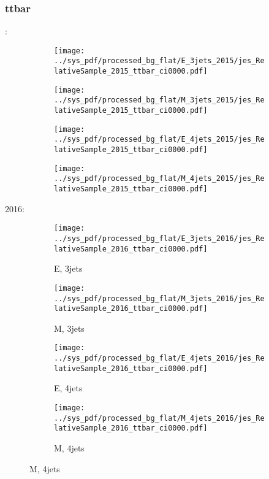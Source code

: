 \documentclass{beamer}
\begin{document}
\begin{frame}
\frametitle{ttbar}
\fontsize{5}{1}:
\begin{figure}
\centering
\begin{subfigure}[b]{0.24\textwidth}
\texttt{[image: ../sys\_pdf/processed\_bg\_flat/E\_3jets\_2015/jes\_RelativeSample\_2015\_ttbar\_ci0000.pdf]}
\end{subfigure}
\begin{subfigure}[b]{0.24\textwidth}
\texttt{[image: ../sys\_pdf/processed\_bg\_flat/M\_3jets\_2015/jes\_RelativeSample\_2015\_ttbar\_ci0000.pdf]}
\end{subfigure}
\begin{subfigure}[b]{0.24\textwidth}
\texttt{[image: ../sys\_pdf/processed\_bg\_flat/E\_4jets\_2015/jes\_RelativeSample\_2015\_ttbar\_ci0000.pdf]}
\end{subfigure}
\begin{subfigure}[b]{0.24\textwidth}
\texttt{[image: ../sys\_pdf/processed\_bg\_flat/M\_4jets\_2015/jes\_RelativeSample\_2015\_ttbar\_ci0000.pdf]}
\end{subfigure}
\end{figure}
2016:
\begin{figure}
\centering
\begin{subfigure}[b]{0.24\textwidth}
\texttt{[image: ../sys\_pdf/processed\_bg\_flat/E\_3jets\_2016/jes\_RelativeSample\_2016\_ttbar\_ci0000.pdf]}
\captionsetup{font=tiny}
\caption{E, 3jets}
\end{subfigure}
\begin{subfigure}[b]{0.24\textwidth}
\texttt{[image: ../sys\_pdf/processed\_bg\_flat/M\_3jets\_2016/jes\_RelativeSample\_2016\_ttbar\_ci0000.pdf]}
\captionsetup{font=tiny}
\caption{M, 3jets}
\end{subfigure}
\begin{subfigure}[b]{0.24\textwidth}
\texttt{[image: ../sys\_pdf/processed\_bg\_flat/E\_4jets\_2016/jes\_RelativeSample\_2016\_ttbar\_ci0000.pdf]}
\captionsetup{font=tiny}
\caption{E, 4jets}
\end{subfigure}
\begin{subfigure}[b]{0.24\textwidth}
\texttt{[image: ../sys\_pdf/processed\_bg\_flat/M\_4jets\_2016/jes\_RelativeSample\_2016\_ttbar\_ci0000.pdf]}
\captionsetup{font=tiny}
\caption{M, 4jets}
\end{subfigure}
\end{figure}
\end{frame}
\end{document}
